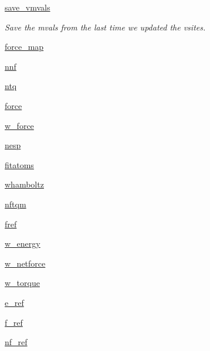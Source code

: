 \begin{DoxyCompactItemize}
\hyperlink{classforcebalance_1_1abinitio_1_1AbInitio_a22037bf43728fa45f387390005e0b131}{save\-\_\-vmvals}
\begin{DoxyCompactList}\small\item\em Save the mvals from the last time we updated the vsites. \end{DoxyCompactList}\item 
\hyperlink{classforcebalance_1_1abinitio_1_1AbInitio_a6558ea4f56053b0f539f987481c57a75}{force\-\_\-map}
\item 
\hyperlink{classforcebalance_1_1abinitio_1_1AbInitio_ac4a5765bf5b089176518f47004fcdb39}{nnf}
\item 
\hyperlink{classforcebalance_1_1abinitio_1_1AbInitio_af8a895f61ddea6b9ca2765ddbf309a75}{ntq}
\item 
\hyperlink{classforcebalance_1_1abinitio_1_1AbInitio_ab483592ce22356d09b52eb594f2f4b8e}{force}
\item 
\hyperlink{classforcebalance_1_1abinitio_1_1AbInitio_a4ec4863edbb6ea4a28777de905d621d3}{w\-\_\-force}
\item 
\hyperlink{classforcebalance_1_1abinitio_1_1AbInitio_ac258ad6180275ba2ffe5f68d1217e4ac}{nesp}
\item 
\hyperlink{classforcebalance_1_1abinitio_1_1AbInitio_a8b12ea0418108cc6c7693d75cc00227f}{fitatoms}
\item 
\hyperlink{classforcebalance_1_1abinitio_1_1AbInitio_a8f70f017ca8ec54c1acdbc85eff06ab9}{whamboltz}
\item 
\hyperlink{classforcebalance_1_1abinitio_1_1AbInitio_a64ae24d7e979723e65358e227b132a4a}{nftqm}
\item 
\hyperlink{classforcebalance_1_1abinitio_1_1AbInitio_ac974dfef45b416947dd21876443d808a}{fref}
\item 
\hyperlink{classforcebalance_1_1abinitio_1_1AbInitio_aa7f09e2ffc1253844c9f0736caf9b9e5}{w\-\_\-energy}
\item 
\hyperlink{classforcebalance_1_1abinitio_1_1AbInitio_af7cbfd50ca6a0b408c417e8d3bdb7cf3}{w\-\_\-netforce}
\item 
\hyperlink{classforcebalance_1_1abinitio_1_1AbInitio_a67643b98cce62c06c95f085d3a3e9722}{w\-\_\-torque}
\item 
\hyperlink{classforcebalance_1_1abinitio_1_1AbInitio_a71d13d3fabd98146c68bb5fc784f6732}{e\-\_\-ref}
\item 
\hyperlink{classforcebalance_1_1abinitio_1_1AbInitio_a6631ee11ee5646d97ea0fa5c9b22fc6a}{f\-\_\-ref}
\item 
\hyperlink{classforcebalance_1_1abinitio_1_1AbInitio_a5a77f4b99a5b01245ab0435d632122a1}{nf\-\_\-ref}

\end{DoxyCompactItemize}

